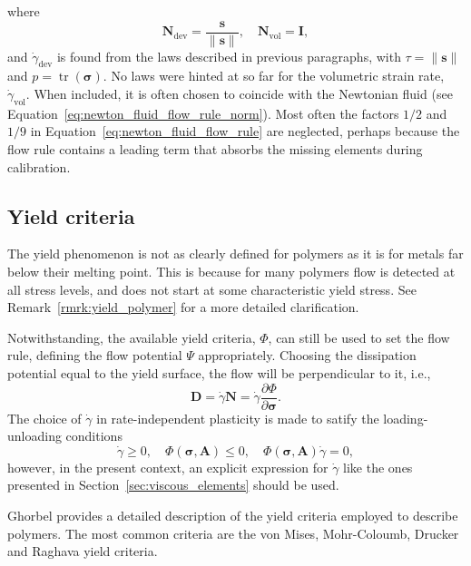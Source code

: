 where
\begin{equation}
	\label{eq:flow_rule_directions}
	\mathbf N_\text{dev} = \frac{\mathbf s}{\|\mathbf s\|},\quad \mathbf N_\text{vol} = \mathbf I,
\end{equation}
and $\dot \gamma_\text{dev}$ is found from the laws described in previous paragraphs, with $\tau=\|\mathbf s\|$ and $p = \operatorname{tr}(\bm \sigma)$.
No laws were hinted at so far for the volumetric strain rate, $\dot \gamma_\text{vol}$.
When included, it is often chosen to coincide with the Newtonian fluid (see Equation~\eqref{eq:newton_fluid_flow_rule_norm}).
Most often the factors $1/2$ and $1/9$ in Equation~\eqref{eq:newton_fluid_flow_rule} are neglected, perhaps because the flow rule contains a leading term that absorbs the missing elements during calibration.


\subsection{Yield criteria}

The yield phenomenon is not as clearly defined for polymers as it is for metals far below their melting point.
This is because for many polymers flow is detected at all stress levels, and does not start at some characteristic yield stress.
See Remark~\ref{rmrk:yield_polymer} for a more detailed clarification.

Notwithstanding, the available yield criteria, $\Phi$, can still be used to set the flow rule, defining the flow potential $\Psi$ appropriately.
Choosing the dissipation potential equal to the yield surface, the flow will be perpendicular to it, i.e.,
\begin{equation}
	\mathbf D = \dot \gamma \mathbf N = \dot \gamma \frac{\partial \Phi}{\partial \bm \sigma}.
\end{equation}
The choice of $\dot \gamma$ in rate-independent plasticity is made to satify the loading-unloading conditions
\begin{equation}
	\dot\gamma \geq 0,\quad \Phi(\bm \sigma, \mathbf A) \leq 0,\quad \Phi(\bm \sigma, \mathbf A) \dot \gamma = 0,
\end{equation}
however, in the present context, an explicit expression for $\dot \gamma$ like the ones presented in Section~\ref{sec:viscous_elements} should be used.

Ghorbel \citep{ghorbelViscoplasticConstitutiveModel2008} provides a detailed description of the yield criteria employed to describe polymers.
The most common criteria are the von Mises, Mohr-Coloumb, Drucker and Raghava yield \citep{balieuNonassociatedViscoplasticityCoupled2014} criteria.

